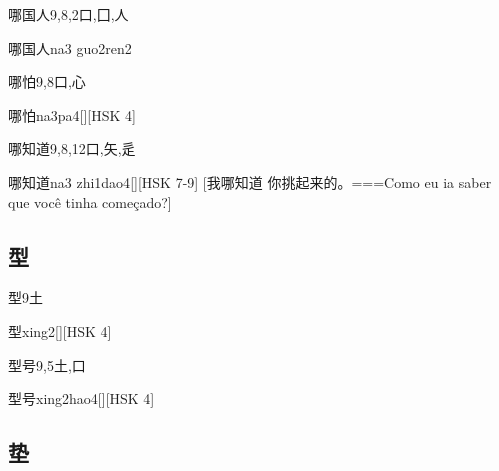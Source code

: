 \begin{Entry}{哪国人}{9,8,2}{⼝,⼞,⼈}
  \begin{Phonetics}{哪国人}{na3 guo2ren2}
  \end{Phonetics}
\end{Entry}

\begin{Entry}{哪怕}{9,8}{⼝,⼼}
  \begin{Phonetics}{哪怕}{na3pa4}[][HSK 4]
  \end{Phonetics}
\end{Entry}

\begin{Entry}{哪知道}{9,8,12}{⼝,⽮,⾡}
  \begin{Phonetics}{哪知道}{na3 zhi1dao4}[][HSK 7-9]
    [我哪知道 你挑起来的。===Como eu ia saber que você tinha começado?]
  \end{Phonetics}
\end{Entry}

\subsection*{型}

\begin{Entry}{型}{9}{⼟}
  \begin{Phonetics}{型}{xing2}[][HSK 4]
  \end{Phonetics}
\end{Entry}

\begin{Entry}{型号}{9,5}{⼟,⼝}
  \begin{Phonetics}{型号}{xing2hao4}[][HSK 4]
  \end{Phonetics}
\end{Entry}

\subsection*{垫}


